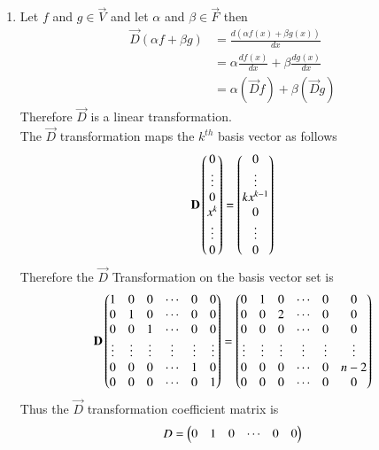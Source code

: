 \documentclass[journal,12pt,twocolumn]{IEEEtran}
\begin{document}
\begin{enumerate}[label=\emph{\alph*)}]
\item
Let $f$ and $g \in \vec{V}$ and let $\alpha$ and $\beta \in \vec{F}$ then 
		\begin{align}
			\vec{D}(\alpha f + \beta g)&=\frac{d(\alpha f(x) + \beta g(x))}{dx} \\
			&=\alpha\frac{df(x)}{dx}+\beta\frac{dg(x)}{dx}\\
			&=\alpha(\vec{D}f)+\beta(\vec{D}g)
		\end{align}
Therefore $\vec{D}$ is a linear transformation.\\
The $\vec{D}$ transformation maps the $k^{th}$ basis vector as follows
		\begin{align}
			\mathbf{D}\begin{pmatrix}0\\\vdots\\0\\x^k\\\vdots\\0\end{pmatrix}
			=\begin{pmatrix}0\\\vdots\\kx^{k-1}\\0\\\vdots\\0\end{pmatrix}
		\end{align}		
Therefore the $\vec{D}$ Transformation on the basis vector set is
		\begin{align}
			\mathbf{D}\begin{pmatrix}1 & 0 & 0 & \cdots & 0 & 0\\
				      0 & 1 & 0 & \cdots & 0 & 0 \\
				      0 & 0 & 1 & \cdots & 0 & 0 \\
				      \vdots & \vdots & \vdots & \vdots & \vdots & \vdots\\
				      0 & 0 & 0 & \cdots & 1 & 0 \\
				      0 & 0 & 0 & \cdots & 0 & 1\end{pmatrix}
			      =\begin{pmatrix}0 & 1 & 0 & \cdots & 0 & 0\\
				      0 & 0 & 2 & \cdots & 0 & 0\\
				      0 & 0 & 0 & \cdots & 0 & 0\\
				      \vdots & \vdots & \vdots & \vdots & \vdots & \vdots\\
				      0 & 0 & 0 & \cdots & 0 & n-2 \\
				      0 & 0 & 0 & \cdots & 0 & 0\end{pmatrix}
		\end{align}
Thus the $\vec{D}$ transformation coefficient matrix is		
\begin{align}
	D=\begin{pmatrix}0 & 1 & 0 & \cdots & 0 & 0\\
\end{pmatrix}
\end{align}
\end{enumerate}
\end{document}
